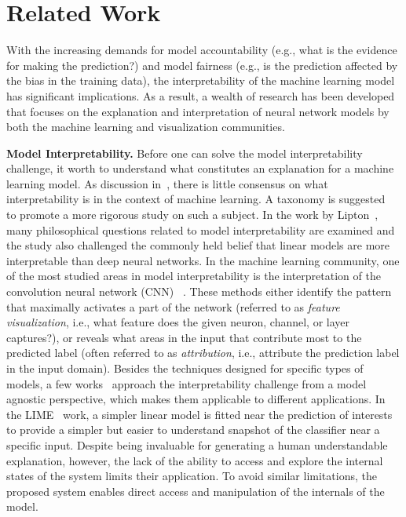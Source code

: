 
\section{Related Work}
With the increasing demands for model accountability (e.g., what is the evidence for making the prediction?) and model fairness (e.g., is the prediction affected by the bias in the training data),
the interpretability of the machine learning model has significant implications. As a result, a wealth of research has been developed that focuses on the explanation and interpretation of neural network models by both the machine learning and visualization communities.

\textbf{Model Interpretability.}
Before one can solve the model interpretability challenge, it worth to understand what constitutes an explanation for a machine learning model.
As discussion in~\cite{Lipton2016, Doshi-Velez2017}, there is little consensus on what interpretability is in the context of machine learning. A taxonomy is suggested~\cite{Doshi-Velez2017} to promote a more rigorous study on such a subject. In the work by Lipton~\cite{Lipton2016}, many philosophical questions related to model interpretability are examined and the study also challenged the commonly held belief that linear models are more interpretable than deep neural networks.
%
In the machine learning community, one of the most studied areas in model interpretability is the interpretation of the convolution neural network (CNN) ~\cite{SimonyanVedaldiZisserman2013, ZeilerFergus2014, YosinskiCluneNguyen2015, OlahMordvintsevSchubert2017, OlahSatyanarayanJohnson2018}.
%
These methods either identify the pattern that maximally activates a part of the network (referred to as \emph{feature visualization}, i.e., what feature does the given neuron, channel, or layer captures?), or reveals what areas in the input that contribute most to the predicted label (often referred to as \emph{attribution}, i.e., attribute the prediction label in the input domain).
%
Besides the techniques designed for specific types of models, a few works~\cite{RibeiroSinghGuestrin2016, LundbergLee2017} approach the interpretability challenge from a model agnostic perspective, which makes them applicable to different applications. In the LIME~\cite{RibeiroSinghGuestrin2016} work, a simpler linear model is fitted near the prediction of interests to provide a simpler but easier to understand snapshot of the classifier near a specific input.
%
Despite being invaluable for generating a human understandable explanation, however, the lack of the ability to access and explore the internal states of the system limits their application. 
To avoid similar limitations, the proposed system enables direct access and manipulation of the internals of the model.

